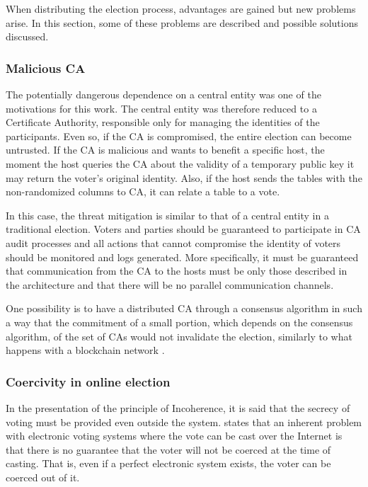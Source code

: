 \documentclass[english]{textolivre}
\begin{document}
When distributing the election process, advantages are gained but new problems arise. In this section, some of these problems are described and possible solutions discussed.

\subsubsection{Malicious CA}

The potentially dangerous dependence on a central entity was one of the motivations for this work. The central entity was therefore reduced to a Certificate Authority, responsible only for managing the identities of the participants. Even so, if the CA is compromised, the entire election can become untrusted. If the CA is malicious and wants to benefit a specific host, the moment the host queries the CA about the validity of a temporary public key it may return the voter's original identity. Also, if the host sends the tables with the non-randomized columns to CA, it can relate a table to a vote.

In this case, the threat mitigation is similar to that of a central entity in a traditional election. Voters and parties should be guaranteed to participate in CA audit processes and all actions that cannot compromise the identity of voters should be monitored and logs generated. More specifically, it must be guaranteed that communication from the CA to the hosts must be only those described in the architecture and that there will be no parallel communication channels.

One possibility is to have a distributed CA through a consensus algorithm in such a way that the commitment of a small portion, which depends on the consensus algorithm, of the set of CAs would not invalidate the election, similarly to what happens with a blockchain network \cite{dziembowski2015proofs, gavzi2019proof, nakamoto}. 

\subsubsection{Coercivity in online election}

In the presentation of the principle of Incoherence, it is said that the secrecy of voting must be provided even outside the system. \textcite{Gritzalis} states that an inherent problem with electronic voting systems where the vote can be cast over the Internet is that there is no guarantee that the voter will not be coerced at the time of casting. That is, even if a perfect electronic system exists, the voter can be coerced out of it.
\end{document}
